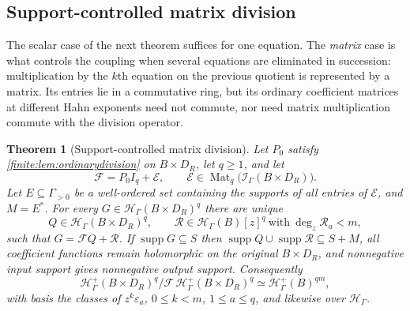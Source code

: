 \documentclass[11pt,letterpaper]{article}
\newtheorem{theorem}{Theorem}[section]
\theoremstyle{definition}
\theoremstyle{remark}
\newcommand{\HH}{\mathscr H}
\newcommand{\Hp}{\mathscr H^{+}}
\newcommand{\Ip}{\mathscr I}
\DeclareMathOperator{\supp}{supp}
\DeclareMathOperator{\Mat}{Mat}
\numberwithin{equation}{section}
\begin{document}
\subsection{Support-controlled matrix division}
\label{finite:sec:matrixdivision}

The scalar case of the next theorem suffices for one equation. The \emph{matrix} case is what controls the coupling when several equations are eliminated in succession: multiplication by the $k$th equation on the previous quotient is represented by a matrix. Its entries lie in a commutative ring, but its ordinary coefficient matrices at different Hahn exponents need not commute, nor need matrix multiplication commute with the division operator.

\begin{theorem}[Support-controlled matrix division]
\label{finite:thm:matrixdivision}
Let $P_0$ satisfy \cref{finite:lem:ordinarydivision} on $B\times D_R$, let $q\geq1$, and let
\[
 \mathcal F=P_0I_q+\mathcal E,
 \qquad \mathcal E\in\Mat_q\bigl(\Ip_\Gamma(B\times D_R)\bigr).
\]
Let $E\subseteq\Gamma_{>0}$ be a well-ordered set containing the supports of all entries of $\mathcal E$, and $M=E^*$. For every $G\in\HH_\Gamma(B\times D_R)^q$ there are \emph{unique}
\[
 Q\in\HH_\Gamma(B\times D_R)^q,
 \qquad
 \mathcal R\in\HH_\Gamma(B)[z]^q
 \ \text{with}\ \deg_z\mathcal R_a<m,
\]
such that $G=\mathcal FQ+\mathcal R$. If $\supp G\subseteq S$ then $\supp Q\cup\supp\mathcal R\subseteq S+M$, all coefficient functions remain holomorphic on the original $B\times D_R$, and nonnegative input support gives nonnegative output support. Consequently
\begin{equation}\label{finite:eq:matrixmodule}
 \Hp_\Gamma(B\times D_R)^q\big/\mathcal F\,\Hp_\Gamma(B\times D_R)^q
 \simeq\Hp_\Gamma(B)^{qm},
\end{equation}
with basis the classes of $z^k\varepsilon_a$, $0\leq k<m$, $1\leq a\leq q$, and likewise over $\HH_\Gamma$.
\end{theorem}
\end{document}
